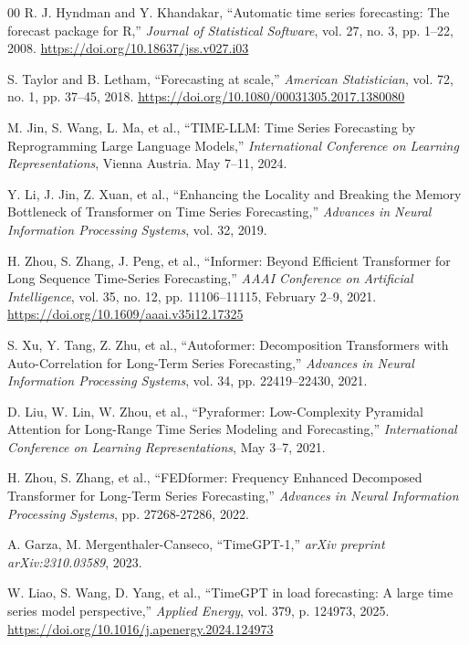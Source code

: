 \documentclass[a4paper,twoside,flushend, 10pt]{article}
\begin{document}
\begin{thebibliography}{00}
R. J. Hyndman and Y. Khandakar,
``Automatic time series forecasting: The forecast package for R,'' \emph{Journal of Statistical Software}, vol. 27, no. 3, pp. 1--22, 2008. \href{https://doi.org/10.18637/jss.v027.i03}{https://doi.org/10.18637/jss.v027.i03}

S. Taylor and B. Letham,
``Forecasting at scale,'' \emph{American Statistician}, vol. 72, no. 1, pp. 37--45, 2018. \href{https://doi.org/10.1080/00031305.2017.1380080}{https://doi.org/10.1080/00031305.2017.1380080}

M. Jin, S. Wang, L. Ma, et al.,
``TIME-LLM: Time Series Forecasting by Reprogramming Large Language Models,'' \emph{International Conference on Learning Representations}, Vienna Austria. May 7--11, 2024.

Y. Li, J. Jin, Z. Xuan, et al.,
``Enhancing the Locality and Breaking the Memory Bottleneck of Transformer on Time Series Forecasting,'' \emph{Advances in Neural Information Processing Systems}, vol. 32, 2019.

H. Zhou, S. Zhang, J. Peng, et al.,
``Informer: Beyond Efficient Transformer for Long Sequence Time-Series Forecasting,'' \emph{AAAI Conference on Artificial Intelligence}, vol. 35, no. 12, pp. 11106--11115, February 2--9, 2021.
\href{https://doi.org/10.1609/aaai.v35i12.17325}{https://doi.org/10.1609/aaai.v35i12.17325}

S. Xu, Y. Tang, Z. Zhu, et al.,
``Autoformer: Decomposition Transformers with Auto-Correlation for Long-Term Series Forecasting,'' \emph{Advances in Neural Information Processing Systems}, vol. 34, pp. 22419--22430, 2021.

D. Liu, W. Lin, W. Zhou, et al.,
``Pyraformer: Low-Complexity Pyramidal Attention for Long-Range Time Series Modeling and Forecasting,'' \emph{International Conference on Learning Representations}, May 3--7, 2021.

H. Zhou, S. Zhang, et al.,
``FEDformer: Frequency Enhanced Decomposed Transformer for Long-Term Series Forecasting,'' \emph{Advances in Neural Information Processing Systems}, pp. 27268-27286, 2022.

A. Garza, M. Mergenthaler-Canseco,
``TimeGPT-1,'' \emph{arXiv preprint arXiv:2310.03589}, 2023.

W. Liao, S. Wang, D. Yang, et al.,
``TimeGPT in load forecasting: A large time series model perspective,'' \emph{Applied Energy}, vol. 379, p. 124973, 2025. \href{https://doi.org/10.1016/j.apenergy.2024.124973}{https://doi.org/10.1016/j.apenergy.2024.124973}

\end{thebibliography}
\end{document}

